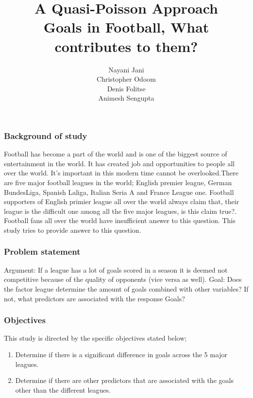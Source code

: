 \documentclass[11pt]{beamer}
\begin{document}
	\author{Nayani Jani\\
		Christopher Odoom\\
		Denis Folitse\\
		Animesh Sengupta\\ }
	\title{\bf{A Quasi-Poisson Approach\\ Goals in Football, What contributes to them? }}
	
	\begin{frame}[plain]
		\maketitle
	\end{frame}
	
	\begin{frame}	
		\frametitle{Background of study}
		Football has become a part of the world and is one of the biggest source of entertainment in the world. It has created job and opportunities to people all over the world. It's important in this modern time cannot be overlooked.There are five major football leagues in the world; English premier league, German BundesLiga, Spanish Laliga, Italian Seria A and France League one. Football supporters of English primier league all over the world always claim that, their league is the difficult one among all the five major leagues, is this claim true?. Football fans all over the world have insufficient answer to this question. This study tries to provide answer to this question.
		
	\end{frame}
	
	
	\begin{frame}
		\frametitle{Problem statement}
		Argument: If a league has a lot of goals scored in a season it is deemed not competitive because of the quality of opponents (vice versa as well).
		Goal: Does the factor league determine the amount of goals combined with other variables? If not, what predictors are associated with the response Goals?	
	\end{frame}
	
	\begin{frame}
		\frametitle{Objectives}
		This study is directed by the specific objectives stated below;\\
		\begin{enumerate}
			
			
			\item Determine if there is a significant difference in goals across the 5 major leagues.
			
			\item Determine if there are other predictors that are associated with the goals other than the different leagues.
			
		\end{enumerate}
	\end{frame}
	
\end{document}
